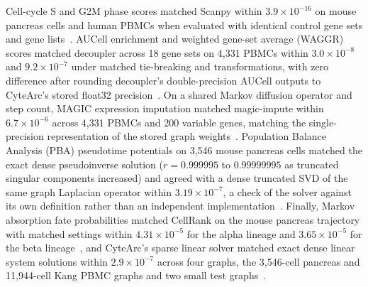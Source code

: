 Cell-cycle S and G2M phase scores matched Scanpy within $3.9\times 10^{-16}$ on mouse pancreas cells and human PBMCs when evaluated with identical control gene sets and gene lists~\cite{wolf2018,bastidas2019}. AUCell enrichment and weighted gene-set average (WAGGR) scores matched decoupler across 18 gene sets on 4,331 PBMCs within $3.0\times 10^{-8}$ and $9.2\times 10^{-7}$ under matched tie-breaking and transformations, with zero difference after rounding decoupler's double-precision AUCell outputs to CyteArc's stored float32 precision~\cite{aibar2017scenic,badia2022decoupler}. On a shared Markov diffusion operator and step count, MAGIC expression imputation matched magic-impute within $6.7\times 10^{-6}$ across 4,331 PBMCs and 200 variable genes, matching the single-precision representation of the stored graph weights~\cite{vandijk2018magic}. Population Balance Analysis (PBA) pseudotime potentials on 3,546 mouse pancreas cells matched the exact dense pseudoinverse solution ($r = 0.999995$ to $0.99999995$ as truncated singular components increased) and agreed with a dense truncated SVD of the same graph Laplacian operator within $3.19\times 10^{-7}$, a check of the solver against its own definition rather than an independent implementation~\cite{weinreb2018pba}. Finally, Markov absorption fate probabilities matched CellRank on the mouse pancreas trajectory with matched settings within $4.31\times 10^{-5}$ for the alpha lineage and $3.65\times 10^{-5}$ for the beta lineage~\cite{lange2022cellrank,weiler2024}, and CyteArc's sparse linear solver matched exact dense linear system solutions within $2.9\times 10^{-7}$ across four graphs, the 3,546-cell pancreas and 11,944-cell Kang PBMC graphs and two small test graphs~\cite{kang2018}.
